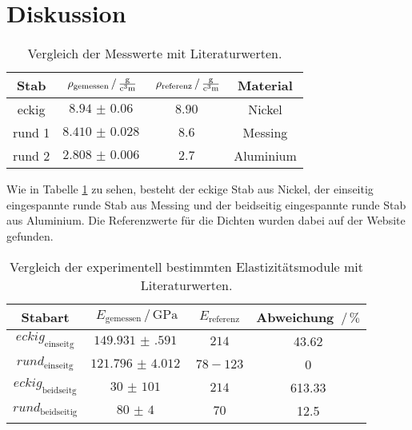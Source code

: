\section{Diskussion}
\label{sec:Diskussion}

\begin{table}
\centering
\caption{Vergleich der Messwerte mit Literaturwerten.}
\begin{tabular}{cccc}
    \toprule
    Stab & $\rho _\text{gemessen} \,/\, \si{\frac{\gram}{\cubic\centi\meter}}$ & $\rho _\text{referenz} \,/\, \si{\frac{\gram}{\cubic\centi\meter}}$  & Material \\
    \midrule
    eckig & $\SI{8.94(6)}{}$ & $\SI{8.90}{}$ & Nickel \\
    rund 1 & $\SI{8.410(28)}{}$ & $\SI{8.6}{}$ & Messing \\
    rund 2 & $\SI{2.808(6)}{}$ & $\SI{2.7}{}$& Aluminium \\
    \bottomrule
\end{tabular}
\label{tab:refferenz}
\end{table}

Wie in Tabelle \ref{tab:refferenz} zu sehen, besteht der eckige Stab aus Nickel, der einseitig eingespannte runde Stab aus Messing und der beidseitig eingespannte runde Stab aus Aluminium.
Die Referenzwerte für die Dichten wurden dabei auf der Website \cite{technik} gefunden.

\begin{table}
\centering
\caption{Vergleich der experimentell bestimmten Elastizitätsmodule mit Literaturwerten.}
\begin{tabular}{cccc}
    \toprule
    Stabart & $E_\text{gemessen}\,/\, \si{\giga\pascal}$ & $E_\text{referenz}$ & Abweichung $\,/\, \%$ \\
    \midrule
    $eckig_\text{einseitg}$ & $\SI{149.931(591)}{}$ & $214$ \cite{nickel} & 43.62\\
    $rund_\text{einseitg}$ & $ \SI{121.796(4012)}{}$ & $78-123$ \cite{messing} & 0 \\
    $eckig_\text{beidseitg}$ & $\SI{30(101)}{}$ & $214$ \cite{nickel}& 613.33 \\
    $rund_\text{beidseitig}$ & $\SI{80(4)}{}$ & $70$ \cite{nickel} & 12.5 \\
\end{tabular}
\label{tab:ele}
\end{table}

